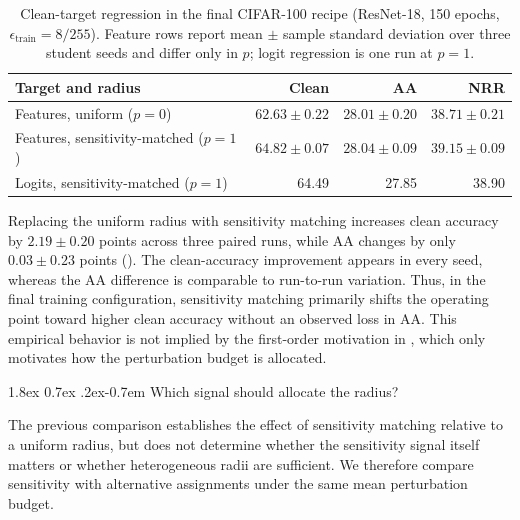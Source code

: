\documentclass{article} %
\makeatletter
\theoremstyle{plain}
\renewcommand{\paragraph}{\@startsection{paragraph}{4}{\z@}%
  {1.8ex \@plus 0.7ex \@minus .2ex}{-0.7em}%
  {\normalfont\normalsize\bfseries}}
\makeatother
\begin{document}
\begin{table}[!htbp]
  \centering
  \small
  \setlength{\tabcolsep}{5pt}
  \caption{
  Clean-target regression in the final CIFAR-100 recipe
  (ResNet-18, 150 epochs, \(\epsilon_{\mathrm{train}}=8/255\)).
  Feature rows report mean \(\pm\) sample standard deviation over three
  student seeds and differ only in \(p\); logit regression is one run at
  \(p=1\).
  }
  \label{tab:finalallocation}
  \begin{tabular}{lrrr}
    \toprule
    Target and radius & Clean & AA & NRR \\
    \midrule
    Features, uniform (\(p=0\))
      & \(62.63\pm0.22\)
      & \(28.01\pm0.20\)
      & \(38.71\pm0.21\) \\
    Features, sensitivity-matched (\(p=1\))
      & \(\mathbf{64.82\pm0.07}\)
      & \(\mathbf{28.04\pm0.09}\)
      & \(\mathbf{39.15\pm0.09}\) \\
    Logits, sensitivity-matched (\(p=1\))
      & 64.49 & 27.85 & 38.90 \\
    \bottomrule
  \end{tabular}
\end{table}

Replacing the uniform radius with sensitivity matching increases clean
accuracy by \(2.19\pm0.20\) points across three paired runs, while AA changes
by only \(0.03\pm0.23\) points ().
The clean-accuracy improvement appears in every seed, whereas the AA
difference is comparable to run-to-run variation.
Thus, in the final training configuration, sensitivity matching primarily
shifts the operating point toward higher clean accuracy without an observed
loss in AA.
This empirical behavior is not implied by the first-order motivation in
, which only motivates how the perturbation budget is
allocated.


\paragraph{Which signal should allocate the radius?}

The previous comparison establishes the effect of sensitivity matching
relative to a uniform radius, but does not determine whether the sensitivity
signal itself matters or whether heterogeneous radii are sufficient.
We therefore compare sensitivity with alternative assignments under the same
mean perturbation budget.
\end{document}
